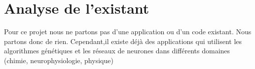 \chapter{Analyse de l'existant}
Pour ce projet nous ne partons pas d'une application ou d'un code existant. Nous partons donc de rien.
Cependant,il existe déjà des applications qui utilisent les algorithmes génétiques et les réseaux de neurones dans différents domaines (chimie, neurophysiologie, physique)


\pagebreak
